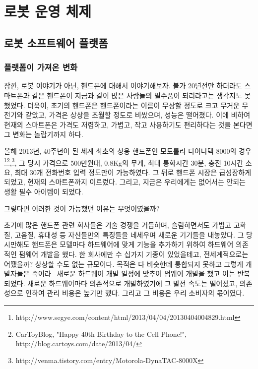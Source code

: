 
\chapter{로봇 운영 체제}

\section{로봇 소프트웨어 플랫폼}

\subsection{플랫폼이 가져온 변화}

잠깐, 로봇 이야기가 아닌, 핸드폰에 대해서 이야기해보자. 불가 20년전만 하더라도 스마트폰과 같은 핸드폰이 지금과 같이 많은 사람들의 필수품이 되리라고는 생각지도 못했었다.
더욱이, 초기의 핸드폰은 핸드폰이라는 이름이 무상할 정도로 크고 무거운 무전기와 같았고, 가격은 상상을 초월할 정도로 비쌌으며, 성능은 떨어졌다.
이에 비하여 현재의 스마트폰은 가격도 저렴하고, 가볍고, 작고 사용하기도 편리하다는 것을 본다면 그 변화는 놀랍기까지 하다.

올해 2013년, 40주년이 된 세계 최초의 상용 핸드폰인 모토롤라 다이나택 8000의 경우\footnote{http://www.segye.com/content/html/2013/04/04/20130404004829.html}\footnote{CarToyBlog, "Happy 40th Birthday to the Cell Phone!",  http://blog.cartoys.com/date/2013/04/},\footnote{http://venma.tistory.com/entry/Motorola-DynaTAC-8000X}, 그 당시 가격으로 500만원대, 0.8Kg의 무게, 최대 통화시간 30분, 충전 10시간 소요, 최대 30개 전화번호 입력 정도만이 가능하였다.
그 뒤로 핸드폰 시장은 급성장하게 되었고, 현재의 스마트폰까지 이르렀다. 그리고, 지금은 우리에게는 없어서는 안되는 생활 필수 아이템이 되었다.

그렇다면 이러한 것이 가능했던 이유는 무엇이였을까? 

초기에 많은 핸드폰 관련 회사들은 기술 경쟁을 거듭하며, 슬림하면서도 가볍고 고화질, 고음질, 휴대성 등 자신들만의 특징들을 네세우며 새로운 기기들을 내놓았다.
그 당시만해도 핸드폰은 모델마다 하드웨어에 맞게 기능을 추가하기 위하여 하드웨어 의존적인 펌웨어 개발을 했다.
한 회사에만 수 십가지 기종이 있었을테고, 전세계적으로는 어땠을까?
상상할 수도 없는 규모이다.
목적은 다 비슷한데 통합되지 못하고 그렇게 개발자들은 죽어라~ 새로운 하드웨어 개발 일정에 맞추어 펌웨어 개발을 했고 이는 반복되었다.
새로운 하드웨어마다 의존적으로 개발하였기에 그 발전 속도는 떨어졌고, 의존성으로 인하여 관리 비용은 높기만 했다.
그리고 그 비용은 우리 소비자의 몫이였다. 

